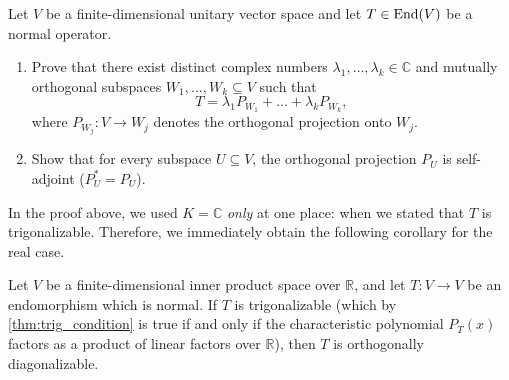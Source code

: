 \begin{exercise}
  \label{exc:spectral_decomposition_projections}
  Let $V$ be a finite-dimensional unitary vector space and let $T \in \operatorname{End}(V)$ be a normal operator.
  \begin{enumerate}[label=\textbf{(\alph*)}]
    \item Prove that there exist distinct complex numbers $\lambda_1, \dots, \lambda_k \in \mathbb{C}$ and mutually orthogonal subspaces $W_1, \dots, W_k \subseteq V$ such that
    \[
    T = \lambda_1 P_{W_1} + \dots + \lambda_k P_{W_k},
    \]
    where $P_{W_j} \colon V \to W_j$ denotes the orthogonal projection onto $W_j$.
    \item Show that for every subspace $U \subseteq V$, the orthogonal projection $P_U$ is self-adjoint ($P_U^* = P_U$).
  \end{enumerate}
\end{exercise}

\begin{remark}
In the proof above, we used $K = \mathbb{C}$ \emph{only} at one place: when we stated that $T$ is trigonalizable. Therefore, we immediately obtain the following corollary for the real case.
\end{remark}

\begin{corollary}
\label{cor:spectral_thm_real_trigonalizable}
Let $V$ be a finite-di\-men\-sional inner product space over $\mathbb{R}$, and let $T \colon V \to V$ be an endomorphism which is normal. If $T$ is trigonalizable (which by \cref{thm:trig_condition} is true if and only if the characteristic polynomial $P_T(x)$ factors as a product of linear factors over $\mathbb{R}$), then $T$ is orthogonally diagonalizable.
\end{corollary}

